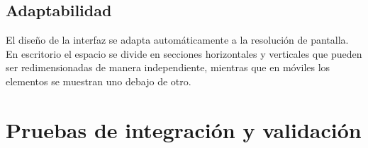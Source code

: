 \subsection{Adaptabilidad}

El diseño de la interfaz se adapta automáticamente a la resolución de pantalla.
En escritorio el espacio se divide en secciones horizontales y verticales que pueden ser redimensionadas de manera independiente, mientras que en móviles los elementos se muestran uno debajo de otro.


\section{Pruebas de integración y validación}

